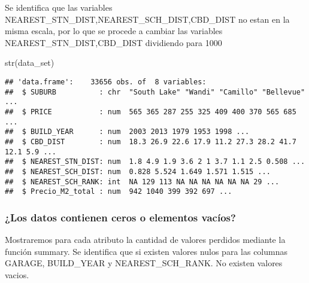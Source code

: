 \documentclass[
]{article}
\newenvironment{Shaded}{\begin{snugshade}}{\end{snugshade}}
\newcommand{\DecValTok}[1]{\textcolor[rgb]{0.00,0.00,0.81}{#1}}
\newcommand{\FunctionTok}[1]{\textcolor[rgb]{0.00,0.00,0.00}{#1}}
\newcommand{\NormalTok}[1]{#1}
\newcommand{\OtherTok}[1]{\textcolor[rgb]{0.56,0.35,0.01}{#1}}
\newcommand{\SpecialCharTok}[1]{\textcolor[rgb]{0.00,0.00,0.00}{#1}}
\begin{document}
Se identifica que las variables
NEAREST\_STN\_DIST,NEAREST\_SCH\_DIST,CBD\_DIST no estan en la misma
escala, por lo que se procede a cambiar las variables
NEAREST\_STN\_DIST,CBD\_DIST dividiendo para 1000

\begin{Shaded}
\end{Shaded}

\begin{Shaded}
\begin{Highlighting}[]
\FunctionTok{str}\NormalTok{(data\_set)}
\end{Highlighting}
\end{Shaded}

\begin{verbatim}
## 'data.frame':    33656 obs. of  8 variables:
##  $ SUBURB          : chr  "South Lake" "Wandi" "Camillo" "Bellevue" ...
##  $ PRICE           : num  565 365 287 255 325 409 400 370 565 685 ...
##  $ BUILD_YEAR      : num  2003 2013 1979 1953 1998 ...
##  $ CBD_DIST        : num  18.3 26.9 22.6 17.9 11.2 27.3 28.2 41.7 12.1 5.9 ...
##  $ NEAREST_STN_DIST: num  1.8 4.9 1.9 3.6 2 1 3.7 1.1 2.5 0.508 ...
##  $ NEAREST_SCH_DIST: num  0.828 5.524 1.649 1.571 1.515 ...
##  $ NEAREST_SCH_RANK: int  NA 129 113 NA NA NA NA NA NA 29 ...
##  $ Precio_M2_total : num  942 1040 399 392 697 ...
\end{verbatim}

\hypertarget{los-datos-contienen-ceros-o-elementos-vacuxedos}{%
\subsubsection{¿Los datos contienen ceros o elementos
vacíos?}\label{los-datos-contienen-ceros-o-elementos-vacuxedos}}

Mostraremos para cada atributo la cantidad de valores perdidos mediante
la función summary. Se identifica que si existen valores nulos para las
columnas GARAGE, BUILD\_YEAR y NEAREST\_SCH\_RANK. No existen valores
vacios.
\end{document}
